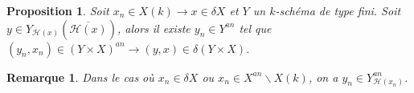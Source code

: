 \documentclass[11pt]{article}
\newcommand{\h}{\mathcal{H}}
\newtheorem{prop}[thm]{Proposition}
\newtheorem{rem}[thm]{Remarque}
\begin{document}

\begin{prop}\label{Existence suite convergente pour tout schéma}
Soit $x_n \in X(k) \rightarrow x \in \delta X$ et $Y$ un $k$-schéma de type fini. Soit $y \in Y_{\mathcal{H}(x)}(\overline{\mathcal{H}(x)})$, alors il existe $y_n \in Y^{an}$ tel que $(y_n, x_n) \in (Y\times X)^{an} \rightarrow (y,x) \in \delta (Y\times X)$.
\end{prop}

\begin{rem}
Dans le cas où $x_n \in \delta X$ ou $x_n \in X^{an}\backslash X(k)$, on a $y_n \in Y^{an}_{\h(x_n)}$.
\end{rem}
\end{document}
